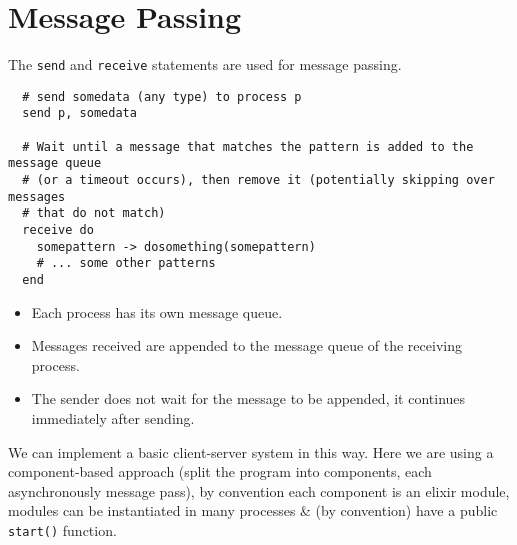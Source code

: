 \section{Message Passing}
The \texttt{send} and \texttt{receive} statements are used for message passing.
\begin{verbatim}
  # send somedata (any type) to process p
  send p, somedata

  # Wait until a message that matches the pattern is added to the message queue 
  # (or a timeout occurs), then remove it (potentially skipping over messages 
  # that do not match)
  receive do
    somepattern -> dosomething(somepattern)
    # ... some other patterns
  end
\end{verbatim}
\begin{itemize}
  \item Each process has its own message queue.
  \item Messages received are appended to the message queue of the receiving process.
  \item The sender does not wait for the message to be appended, it continues immediately after sending.
\end{itemize}

We can implement a basic client-server system in this way. Here we are using a component-based approach 
(split the program into components, each asynchronously message pass), by convention each component is an 
elixir module, modules can be instantiated in many processes \& (by convention) have a public \texttt{start()} function.

